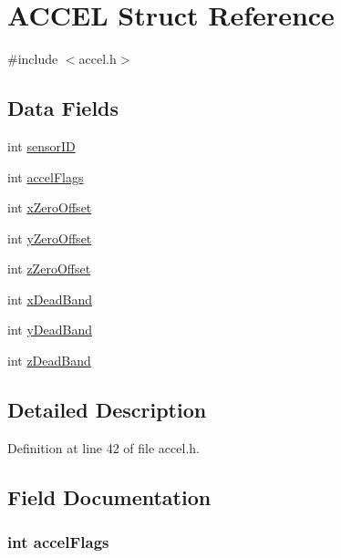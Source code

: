 \hypertarget{struct_a_c_c_e_l}{
\section{ACCEL Struct Reference}
\label{struct_a_c_c_e_l}
}


{\ttfamily \#include $<$accel.h$>$}

\subsection*{Data Fields}
\begin{DoxyCompactItemize}
\item 
int \hyperlink{struct_a_c_c_e_l_a4f5a5e2cb7ee061dd0bd29b7086d89ac}{sensorID}
\item 
int \hyperlink{struct_a_c_c_e_l_ae10f1d2d5f2b77bc0647d428f483f6e0}{accelFlags}
\item 
int \hyperlink{struct_a_c_c_e_l_afe176df047a663a3c9d03a682eb49325}{xZeroOffset}
\item 
int \hyperlink{struct_a_c_c_e_l_afac1c21e2382537c1255c0e6e42c4770}{yZeroOffset}
\item 
int \hyperlink{struct_a_c_c_e_l_a28849c67acd5ce8dfbee6d408e3ebc04}{zZeroOffset}
\item 
int \hyperlink{struct_a_c_c_e_l_a3cefebaa99c11bd1a016a8c062bcc362}{xDeadBand}
\item 
int \hyperlink{struct_a_c_c_e_l_a02e257557b0fc42513605236fa8334fb}{yDeadBand}
\item 
int \hyperlink{struct_a_c_c_e_l_a3aa860d734149d6bee92a76050890c67}{zDeadBand}
\end{DoxyCompactItemize}


\subsection{Detailed Description}


Definition at line 42 of file accel.h.



\subsection{Field Documentation}
\hypertarget{struct_a_c_c_e_l_ae10f1d2d5f2b77bc0647d428f483f6e0}{
\subsubsection[{accelFlags}]{\setlength{\rightskip}{0pt plus 5cm}int {\bf accelFlags}}}
\label{struct_a_c_c_e_l_ae10f1d2d5f2b77bc0647d428f483f6e0}


